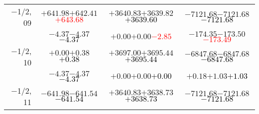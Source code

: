 \documentclass[compress]{beamer}
\begin{document}
\begin{frame}
{\begin{tabular}{r | c | c | c}
$-$1/2, 09 & $+641.98$\hspace{0.1 cm}$+642.41$\hspace{0.1 cm}\textcolor{red}{$+643.68$} & $+3640.83$\hspace{0.1 cm}$+3639.82$\hspace{0.1 cm}\textcolor{black}{$+3639.60$} & $-7121.68$\hspace{0.1 cm}$-7121.68$\hspace{0.1 cm}\textcolor{black}{$-7121.68$} \\
           & $-4.37$\hspace{0.1 cm}$-4.37$\hspace{0.1 cm}\textcolor{black}{$-4.37$} & $+0.00$\hspace{0.1 cm}$+0.00$\hspace{0.1 cm}\textcolor{red}{$-2.85$} & $-174.35$\hspace{0.1 cm}$-173.50$\hspace{0.1 cm}\textcolor{red}{$-173.49$} \\
$-$1/2, 10 & $+0.00$\hspace{0.1 cm}$+0.38$\hspace{0.1 cm}\textcolor{black}{$+0.38$} & $+3697.00$\hspace{0.1 cm}$+3695.44$\hspace{0.1 cm}\textcolor{black}{$+3695.44$} & $-6847.68$\hspace{0.1 cm}$-6847.68$\hspace{0.1 cm}\textcolor{black}{$-6847.68$} \\
           & $-4.37$\hspace{0.1 cm}$-4.37$\hspace{0.1 cm}\textcolor{black}{$-4.37$} & $+0.00$\hspace{0.1 cm}$+0.00$\hspace{0.1 cm}\textcolor{black}{$+0.00$} & $+0.18$\hspace{0.1 cm}$+1.03$\hspace{0.1 cm}\textcolor{black}{$+1.03$} \\
$-$1/2, 11 & $-641.98$\hspace{0.1 cm}$-641.54$\hspace{0.1 cm}\textcolor{black}{$-641.54$} & $+3640.83$\hspace{0.1 cm}$+3638.73$\hspace{0.1 cm}\textcolor{black}{$+3638.73$} & $-7121.68$\hspace{0.1 cm}$-7121.68$\hspace{0.1 cm}\textcolor{black}{$-7121.68$} \\

\end{tabular}}
\end{frame}
\end{document}
